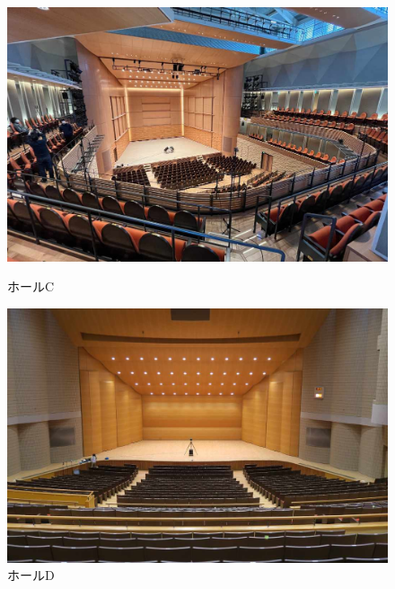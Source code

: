 \documentclass[11pt,a4j]{jreport}
\begin{document}
\begin{figure}[H]
  \begin{minipage}[b]{.5\textwidth}
    \centering
    \includegraphics[width=.9\linewidth]{images/measuredHalls/w90h60/picture_c.jpg}
    \caption*{ホールC}
  \end{minipage}%
  \begin{minipage}[b]{.5\textwidth}
    \centering
    \includegraphics[width=.9\linewidth]{images/measuredHalls/w90h60/picture_d.jpg}
    \caption*{ホールD}
  \end{minipage}


\end{figure}
\end{document}
